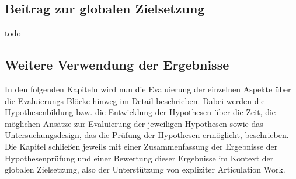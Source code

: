\subsection{Beitrag zur globalen Zielsetzung}

todo

\subsection{Weitere Verwendung der Ergebnisse}

In den folgenden Kapiteln wird nun die Evaluierung der einzelnen Aspekte über die Evaluierungs-Blöcke hinweg im Detail beschrieben. Dabei werden die Hypothesenbildung bzw. die Entwicklung der Hypothesen über die Zeit, die möglichen Ansätze zur Evaluierung der jeweiligen Hypothesen sowie das Untersuchungsdesign, das die Prüfung der Hypothesen ermöglicht, beschrieben. Die Kapitel schließen jeweils mit einer Zusammenfassung der Ergebnisse der Hypothesenprüfung und einer Bewertung dieser Ergebnisse im Kontext der globalen Zielsetzung, also der Unterstützung von expliziter Articulation Work.

